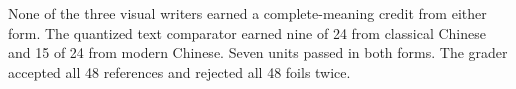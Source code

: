 \par None of the three visual writers earned a complete-meaning credit from either form. The quantized text comparator earned nine of 24 from classical Chinese and 15 of 24 from modern Chinese. Seven units passed in both forms. The grader accepted all 48 references and rejected all 48 foils twice.
